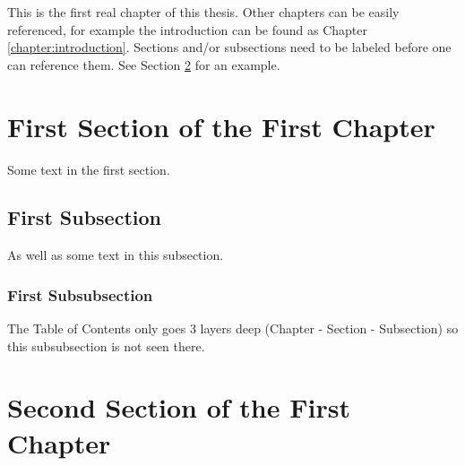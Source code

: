 This is the first real chapter of this thesis. Other chapters can be easily referenced, for example the introduction can be found as Chapter \ref{chapter:introduction}. Sections and/or subsections need to be labeled before one can reference them. See Section \ref{sec:second-section} for an example.

\section{First Section of the First Chapter} %
Some text in the first section. %
\subsection{First Subsection} %
As well as some text in this subsection. 
\subsubsection{First Subsubsection} %
The Table of Contents only goes 3 layers deep (Chapter - Section - Subsection) so this subsubsection is not seen there.

\section{Second Section of the First Chapter}\label{sec:second-section} %
